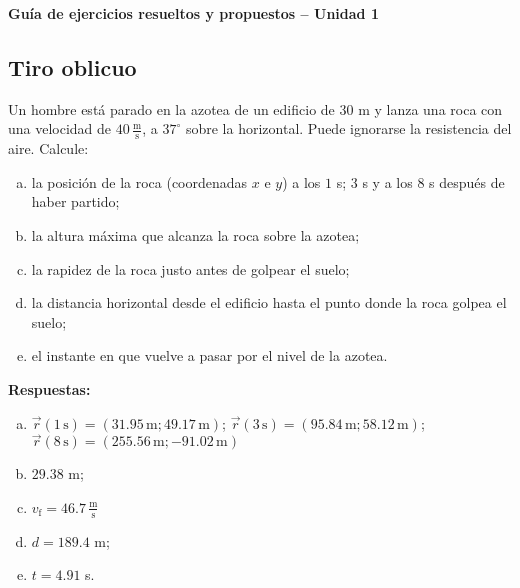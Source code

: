 \documentclass[addpoints]{exam}
\newcommand{\grado}[0]{^{\circ}}
\newcommand{\rtas}{\textbf{Respuestas: }}
\begin{document}
\renewcommand{\tablename}{Tabla}


\begin{tcolorbox}[colback=white,arc=0mm,colframe=black]
    \begin{center}
        \Large\textbf{Guía de ejercicios resueltos y propuestos -- Unidad 1}
    \end{center}
\end{tcolorbox}

\vspace{11pt}

\begin{questions}

    \section{Tiro oblicuo}

    \question Un hombre está parado en la azotea de un edificio de $30$ m y lanza una roca con una velocidad de $40 \, \frac{\text{m}}{\text{s}}$, a $37\grado$ sobre la horizontal. Puede ignorarse la resistencia del aire. Calcule: 
    \begin{enumerate}[a)]
        \item la posición de la roca (coordenadas $x$ e $y$) a los $1$ s; $3$ s y a los $8$ s después de haber partido;
        \item la altura máxima que alcanza la roca sobre la azotea;
        \item la rapidez de la roca justo antes de golpear el suelo;
        \item la distancia horizontal desde el edificio hasta el punto donde la roca golpea el suelo;
        \item el instante en que vuelve a pasar por el nivel de la azotea.
    \end{enumerate}

    \rtas
    \begin{enumerate}[a)]
        \item $\vec{r} (1 \, \text{s}) = \left(31.95 \, \text{m} ; 49.17 \, \text{m} \right) $; $\vec{r} (3 \, \text{s}) = \left( 95.84 \, \text{m} ; 58.12 \, \text{m} \right) $; $\vec{r} (8 \, \text{s}) = \left( 255.56 \, \text{m} ; -91.02 \, \text{m} \right) $
        \item $29.38$ m;
        \item $v_\text{f} = 46.7 \, \frac{\text{m}}{\text{s}}$
        \item $d = 189.4$ m;
        \item $t = 4.91$ s.
    \end{enumerate}


\end{questions}
\end{document}
